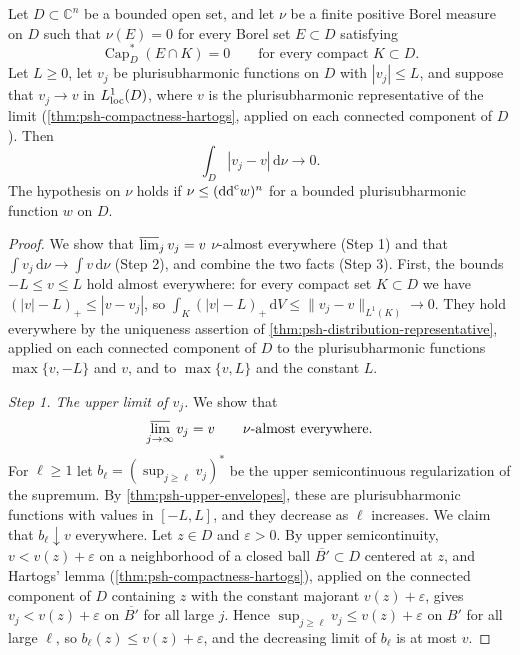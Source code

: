 \begin{lemma}\label{lem:bounded-psh-fixed-measure-continuity}
Let $D\subset\mathbb C^n$ be a bounded open set, and let $\nu$ be a finite positive Borel measure on $D$ such that $\nu(E)=0$ for every Borel set $E\subset D$ satisfying
\[
 \operatorname{Cap}_D^*(E\cap K)=0\qquad\text{for every compact }K\subset D.
\]
Let $L\geq0$, let $v_j$ be plurisubharmonic functions on $D$ with $|v_j|\leq L$, and suppose that $v_j\to v$ in $L^1_{\mathrm{loc}}(D)$, where $v$ is the plurisubharmonic representative of the limit (\cref{thm:psh-compactness-hartogs}, applied on each connected component of $D$). Then
\[
 \int_D|v_j-v|\,\mathrm d\nu\longrightarrow0.
\]
The hypothesis on $\nu$ holds if $\nu\leq(\mathrm{dd}^{\mathrm{c}} w)^n$ for a bounded plurisubharmonic function $w$ on $D$.
\end{lemma}
\begin{proof}
We show that $\varlimsup_jv_j=v$ $\nu$-almost everywhere (Step 1) and that $\int v_j\,\mathrm d\nu\to\int v\,\mathrm d\nu$ (Step 2), and combine the two facts (Step 3). First, the bounds $-L\le v\le L$ hold almost everywhere: for every compact set $K\subset D$ we have $(|v|-L)_+\le|v-v_j|$, so $\int_K(|v|-L)_+\,\mathrm dV\le\|v_j-v\|_{L^1(K)}\to0$. They hold everywhere by the uniqueness assertion of \cref{thm:psh-distribution-representative}, applied on each connected component of $D$ to the plurisubharmonic functions $\max\{v,-L\}$ and $v$, and to $\max\{v,L\}$ and the constant $L$.

\emph{Step 1. The upper limit of $v_j$.} We show that
\begin{equation}\label{eq:fixed-measure-psh-limsup}
 \varlimsup_{j\to\infty}v_j=v\qquad\nu\text{-almost everywhere}.
\end{equation}
For $\ell\ge1$ let $b_\ell=(\sup_{j\geq\ell}v_j)^*$ be the upper semicontinuous regularization of the supremum. By \cref{thm:psh-upper-envelopes}, these are plurisubharmonic functions with values in $[-L,L]$, and they decrease as $\ell$ increases. We claim that $b_\ell\downarrow v$ everywhere. Let $z\in D$ and $\varepsilon>0$. By upper semicontinuity, $v<v(z)+\varepsilon$ on a neighborhood of a closed ball $\overline{B'}\subset D$ centered at $z$, and Hartogs' lemma (\cref{thm:psh-compactness-hartogs}), applied on the connected component of $D$ containing $z$ with the constant majorant $v(z)+\varepsilon$, gives $v_j<v(z)+\varepsilon$ on $\overline{B'}$ for all large $j$. Hence $\sup_{j\ge\ell}v_j\le v(z)+\varepsilon$ on $B'$ for all large $\ell$, so $b_\ell(z)\le v(z)+\varepsilon$, and the decreasing limit of $b_\ell$ is at most $v$.


\end{proof}
